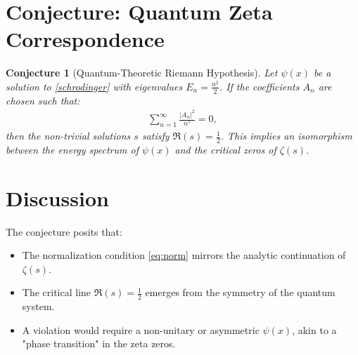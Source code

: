 \documentclass[10pt, oneside]{article}
\newtheorem{conjecture}{Conjecture}
\begin{document}
\section{Conjecture: Quantum Zeta Correspondence}
\begin{conjecture}[Quantum-Theoretic Riemann Hypothesis]
  Let $\psi(x)$ be a solution to \eqref{schrodinger} with eigenvalues $E_n = \frac{n^2}{2}$. If the coefficients $A_n$ are chosen such that:
  \begin{align}
    \sum_{n=1}^\infty \frac{|A_n|^2}{n^s} = 0, \label{eq:zeta}
  \end{align}
  then the non-trivial solutions $s$ satisfy $\Re(s) = \frac{1}{2}$. This implies an isomorphism between the energy spectrum of $\psi(x)$ and the critical zeros of $\zeta(s)$.
\end{conjecture}

\section{Discussion}
The conjecture posits that:
\begin{itemize}
  \item The normalization condition \eqref{eq:norm} mirrors the analytic continuation of $\zeta(s)$.
  \item The critical line $\Re(s) = \frac{1}{2}$ emerges from the symmetry of the quantum system.
  \item A violation would require a non-unitary or asymmetric $\psi(x)$, akin to a "phase transition" in the zeta zeros.
\end{itemize}



\end{document}
